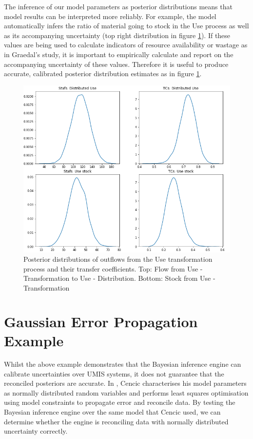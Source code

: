 \documentclass[ %
                    author={Tom Jager},
                supervisor={Dr. Daniel Schien},
                    degree={MEng},
                     title={A Bayesian Inference Engine for Calibrating Uncertainty over UMIS Structured MFA Systems},
                  subtitle={},
                      type={research},
                      year={2019} ]{dissertation}
\begin{document}
The inference of our model parameters as posterior distributions means that model results can be interpreted more reliably. For example, the model automatically infers the ratio of material going to stock in the Use process as well as its accompanying uncertainty (top right distribution in figure \ref{fig:graedal_posteriors}). If these values are being used to calculate indicators of resource availability or wastage as in Graedal's study, it is important to empirically calculate and report on the accompanying uncertainty of these values. Therefore it is useful to produce accurate, calibrated posterior distribution estimates as in figure \ref{fig:graedal_posteriors}.


\begin{figure}[h!]
    \centering
    \includegraphics[width=0.5\linewidth]{images/graedal_posteriors.png}
    \caption{Posterior distributions of outflows from the Use transformation process and their transfer coefficients. Top: Flow from Use - Transformation to Use - Distribution. Bottom: Stock from Use - Transformation}
    \label{fig:graedal_posteriors}
\end{figure}

\section{Gaussian Error Propagation Example}
\label{sec:gauss_example}
Whilst the above example demonstrates that the Bayesian inference engine can calibrate uncertainties over UMIS systems, it does not guarantee that the reconciled posteriors are accurate. In \cite{cencic2016nonlinear}, Cencic characterises his model parameters as normally distributed random variables and performs least squares optimisation using model constraints to propagate error and reconcile data. By testing the Bayesian inference engine over the same model that Cencic used, we can determine whether the engine is reconciling data with normally distributed uncertainty correctly.
\end{document}
